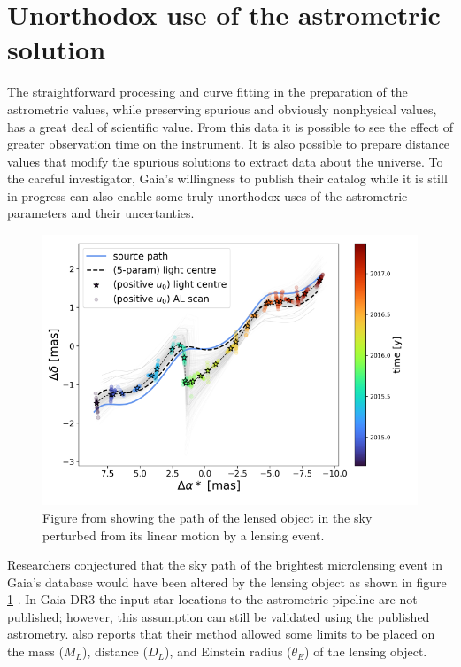 \documentclass[preprint2]{aastex631}
\begin{document}
\section{Unorthodox use of the astrometric solution} \label{sec:unorthodox}

The straightforward processing and curve fitting in the preparation of the astrometric values, while preserving spurious and obviously nonphysical values, has a great deal of scientific value. From this data it is possible to see the effect of greater observation time on the instrument. It is also possible to prepare distance values that modify the spurious solutions to extract data about the universe. To the careful investigator, Gaia's willingness to publish their catalog while it is still in progress can also enable some truly unorthodox uses of the astrometric parameters and their uncertanties.

\begin{figure}
	\includegraphics[width=\columnwidth]{microlensingpath.png}
	\caption{Figure from \cite{jablonskaThere2022} showing the path of the lensed object in the sky perturbed from its linear motion by a lensing event.}
	\label{fig:starpath}
\end{figure}

Researchers conjectured that the sky path of the brightest microlensing event in Gaia's database would have been altered by the lensing object as shown in figure \ref{fig:starpath} \citep{jablonskaThere2022} . In Gaia DR3 the input star locations to the astrometric pipeline are not published; however, this assumption can still be validated using the published astrometry. \cite{jablonskaThere2022} also reports that their method allowed some limits to be placed on the mass ($M_L$), distance ($D_L$), and Einstein radius ($\theta_E$) of the lensing object. 
\end{document}
